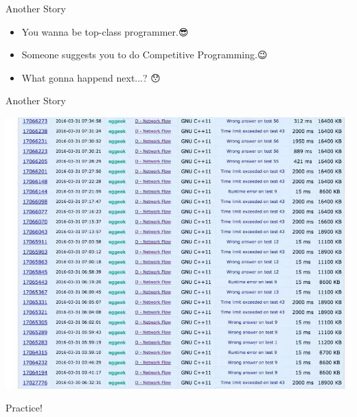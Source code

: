 \begin{frame}{Another Story}
\begin{itemize}
  \item<1-> You wanna be top-class programmer.😎
  \item<2-> Someone suggests you to do Competitive Programming.😉
  \item<3-> What gonna happend next...? 😯
\end{itemize}
\end{frame}

\begin{frame}{Another Story}
\begin{minipage}{.75\textwidth}
  \begin{adjustbox}{max totalsize={1.\textwidth}{1.\textheight}, left}
  \centering
  \includegraphics[width=\textwidth]{pic/sub0.jpg}
  \end{adjustbox}
\end{minipage}%
\begin{minipage}{.25\textwidth}
  Practice!
\end{minipage}
\end{frame}

